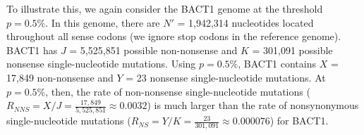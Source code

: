 To illustrate this, we again consider
the BACT1 genome at the threshold $p = 0.5\%$.
%
In this genome, there are $N'$ = 1,942,314 nucleotides
located throughout all sense codons (we ignore stop codons in the reference genome).
%
BACT1 has $J$ = 5,525,851 possible non-nonsense and
$K$ = 301,091 possible nonsense single-nucleotide mutations.
%
Using $p = 0.5\%$, BACT1 contains
$X$ = 17,849 non-nonsense and
$Y$ = 23 nonsense single-nucleotide mutations.
%
At $p = 0.5\%$, then, the rate of non-nonsense single-nucleotide mutations
($R_{NNS} = X / J = \frac{17,849}{5,525,851}
\approx 0.0032$)
is much larger than the rate of nonsynonymous single-nucleotide mutations
($R_{NS} = Y / K = \frac{23}{301,091}
\approx 0.000076$)
for BACT1.
\endinput